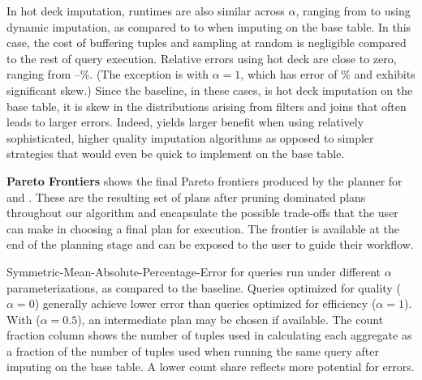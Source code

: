 {In hot deck imputation, runtimes are also similar across $\alpha$, ranging from
\runtimehotdecklow{} to \runtimehotdeckhigh{} using dynamic imputation, as compared to
\runtimehotdecklowbase{} to \runtimehotdeckhighbase{} when imputing on the base table. In
this case, the cost of buffering tuples and sampling at random is negligible compared to the
rest of query execution. Relative errors using hot deck are close to zero, ranging from
\smapehotdecklow{}--\smapehotdeckhigh{}\%. (The exception is  with $\alpha=1$, which has error
of \smapehotdeckhighoutlier{}\% and exhibits significant skew.) Since the baseline, in these
cases, is hot deck imputation on the base table, it is skew in the distributions arising from
filters and joins that often leads to larger errors. Indeed, \ProjectName{} yields
larger benefit when using relatively sophisticated, higher quality imputation algorithms as
opposed to simpler strategies that would even be quick to implement on the base table.

\textbf{Pareto Frontiers}\quad
{} shows the final Pareto frontiers produced by the planner for  and . These are the resulting set of plans after pruning dominated plans throughout our algorithm
and encapsulate the possible trade-offs that the user can make in choosing a final plan for execution. The frontier is available at the end of the planning stage and
can be exposed to the user to guide their workflow.

\begin{table}
\centering

\caption{Symmetric-Mean-Absolute-Percentage-Error for queries run under different $\alpha$ parameterizations, as compared to the baseline.
Queries optimized
    for quality ($\alpha=0$) generally achieve lower error than queries optimized for
    efficiency ($\alpha=1$). With ($\alpha=0.5$), an intermediate plan may be chosen if
    available.
    The count fraction column shows the number of tuples used in calculating each aggregate
     as a fraction of the number of tuples used when running the same query after imputing on the base table.
    A lower count share reflects more potential for errors.}
\label{table:smape}
\end{table}

}
